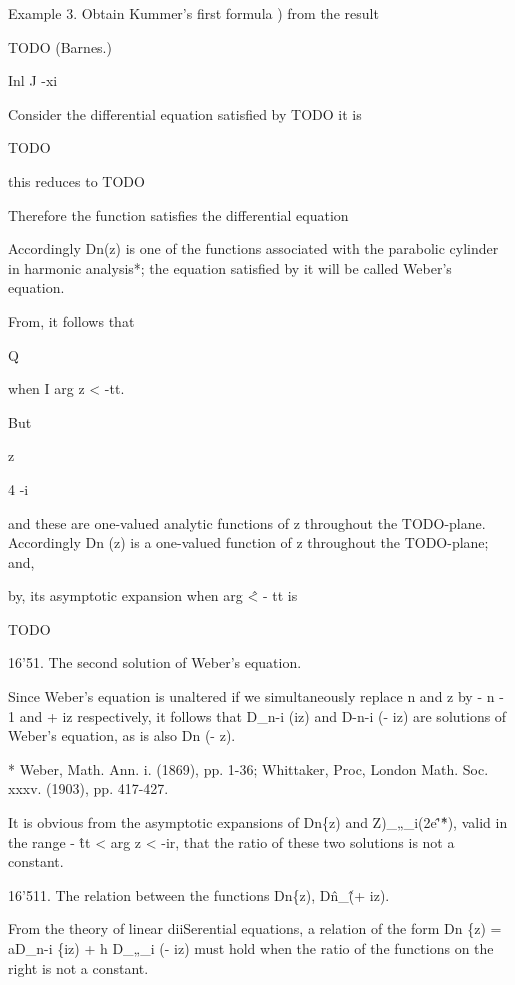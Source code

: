 %
%

Example 3. Obtain Kummer's first formula ) from the result

TODO (Barnes.)

Inl J -xi


Consider the differential equation satisfied by TODO it is

TODO

this reduces to TODO

Therefore the function satisfies the differential equation

Accordingly Dn(z) is one of the functions associated with the
parabolic cylinder in harmonic analysis*; the equation satisfied by it
will be called Weber's equation.

From, it follows that

Q

when I arg z < -tt.

But

z

4 -i

and these are one-valued analytic functions of z throughout the
TODO-plane. Accordingly Dn (z) is a one-valued function of z
throughout the TODO-plane; and,

by, its asymptotic expansion when arg \^ < - tt is

TODO

16'51. The second solution of Weber's equation.

Since Weber's equation is unaltered if we simultaneously replace n and
z by - n - 1 and + iz respectively, it follows that D\_n-i (iz) and
D-n-i (- iz) are solutions of Weber's equation, as is also Dn (- z).

* Weber, Math. Ann. i. (1869), pp. 1-36; Whittaker, Proc, London Math.
Soc. xxxv. (1903), pp. 417-427.

%
%

It is obvious from the asymptotic expansions of Dn\{z) and
Z)\_„\_i(2e\^'\^*), valid in the range - \^ tt < arg z < -ir, that the
ratio of these two solutions is not a constant.

16'511. The relation between the functions Dn\{z), D\^n\_\^ (+ iz).

From the theory of linear diiSerential equations, a relation of the
form Dn \{z) = aD\_n-i \{iz) + h D\_„\_i (- iz) must hold when the
ratio of the functions on the right is not a constant.

